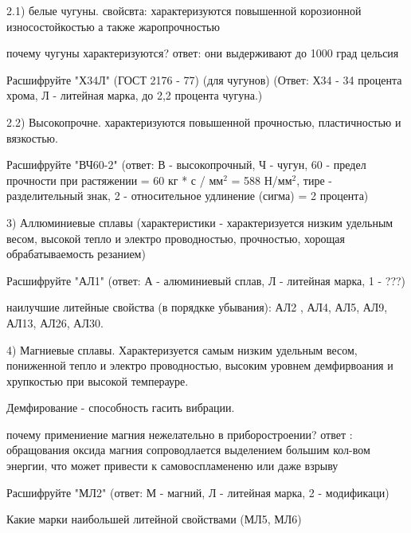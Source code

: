 {\begin{center}
    \par 2.1) белые чугуны. свойсвта: характеризуются повышенной корозионной износостойкостью а также жаропрочностью

    \par почему чугуны характеризуются? ответ: они выдерживают до 1000 град цельсия 

    \par Расшифруйте "Х34Л" (ГОСТ 2176 - 77) (для чугунов) (Ответ: Х34 - 34 процента хрома, Л - литейная марка, до 2,2 процента чугуна.)

    \par 2.2) Высокопрочне. характеризуются повышенной прочностью, пластичностью и вязкостью.

    \par Расшифруйте "ВЧ60-2" (ответ: В - высокопрочный, Ч - чугун, 60 - предел прочности при растяжении = 60 кг * с / $\text{мм}^2$ = 588 Н/$\text{мм}^2$, тире - разделительный знак, 2 - относительное удлинение (сигма) = 2 процента) 

    \par 3) Аллюминиевые сплавы (характеристики - характеризуется низким удельным весом, высокой тепло и электро проводностью, прочностью, хорощая обрабатываемость резанием)

    \par Расшифруйте "АЛ1" (ответ: А - алюминиевый сплав, Л - литейная марка, 1 - ???) 

    \par наилучшие литейные свойства (в порядкке убывания): АЛ2 , АЛ4, АЛ5, АЛ9, АЛ13, АЛ26, АЛ30.

    \par 4) Магниевые сплавы. Характеризуется самым низким удельным весом, пониженной тепло и электро проводностью, высоким уровнем демфирвоания и хрупкостью при высокой темперауре.  

    \par Демфирование - способность гасить вибрации.

    \par почему примениение магния нежелательно в приборостроении?  ответ : обращования оксида магния сопроводлается выделением большим кол-вом энергии, что может привести к самовоспламененю или даже взрыву 

    \par Расшифруйте "МЛ2" (ответ: М - магний, Л - литейная марка, 2 - модификаци)

    \par Какие марки наибольшей литейной свойствами (МЛ5, МЛ6)


\end{center}}
